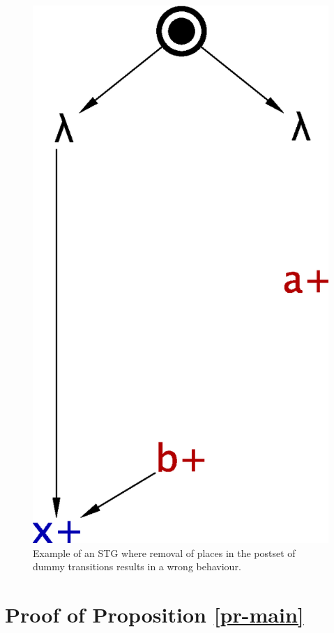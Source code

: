 \begin{figure}[!tb]
    \includegraphics[scale=0.3]{EXPERIMENTS/stg/dummy_counterexample_removed}%
    \hfill%
    {}
    \caption[Example of invalid place removal]{\label{fi-dummy-counterexample}
        Example of an STG where removal of places in the postset of dummy transitions results in a wrong behaviour.
    }
\end{figure}

\section{Proof of Proposition \ref{pr-main}}

